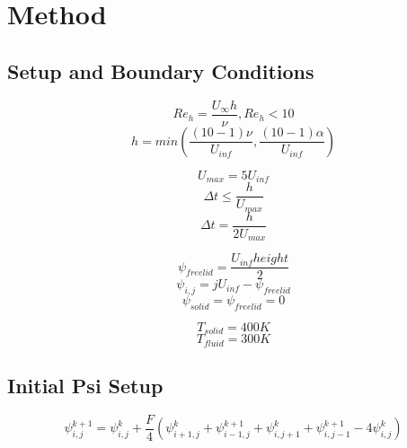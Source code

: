 \section{Method}


\subsection{Setup and Boundary Conditions}
\begin{equation}
    Re_h = \frac{U_\infty h}{\nu}, Re_h < 10
\end{equation}
\begin{equation}
    h = min\left( \frac{(10 - 1) \nu}{U_{inf}}, \frac{(10 - 1) \alpha}{U_{inf}} \right)
\end{equation}

\begin{equation}
    U_{max} = 5 U_{inf}
\end{equation}
\begin{equation}
    \Delta t \leq \frac{h}{U_{max}}
\end{equation}
\begin{equation}
    \Delta t = \frac{h}{2 U_{max}}
\end{equation}

\begin{equation}
    \psi_{free lid} = \frac{U_{inf} height}{2}
\end{equation}
\begin{equation}
    \psi_{i, j} = j U_{inf} - \psi_{free lid}
\end{equation}
\begin{equation}
    \psi_{solid} = \psi_{free lid} = 0
\end{equation}

\begin{equation}
    T_{solid} = 400K
\end{equation}
\begin{equation}
    T_{fluid} = 300K
\end{equation}


\subsection{Initial Psi Setup}
\begin{equation}
    \psi_{i, j}^{k + 1} = \psi_{i, j}^{k} + \frac{F}{4} \left( \psi_{i + 1, j}^{k} + \psi_{i - 1, j}^{k + 1} + \psi_{i, j + 1}^{k} + \psi_{i, j - 1}^{k + 1} - 4 \psi_{i, j}^{k} \right)
\end{equation}


